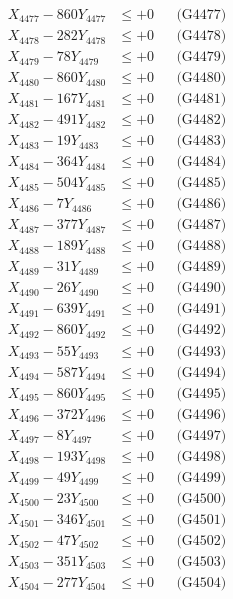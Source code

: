 \documentclass[a4paper,10pt]{article}
\begin{document}
{\begin{align}
X_{4477} - 860Y_{4477} &\leq +0 && \text{(G4477)} \\
X_{4478} - 282Y_{4478} &\leq +0 && \text{(G4478)} \\
X_{4479} - 78Y_{4479} &\leq +0 && \text{(G4479)} \\
X_{4480} - 860Y_{4480} &\leq +0 && \text{(G4480)} \\
\allowbreak
X_{4481} - 167Y_{4481} &\leq +0 && \text{(G4481)} \\
X_{4482} - 491Y_{4482} &\leq +0 && \text{(G4482)} \\
X_{4483} - 19Y_{4483} &\leq +0 && \text{(G4483)} \\
X_{4484} - 364Y_{4484} &\leq +0 && \text{(G4484)} \\
X_{4485} - 504Y_{4485} &\leq +0 && \text{(G4485)} \\
X_{4486} - 7Y_{4486} &\leq +0 && \text{(G4486)} \\
X_{4487} - 377Y_{4487} &\leq +0 && \text{(G4487)} \\
X_{4488} - 189Y_{4488} &\leq +0 && \text{(G4488)} \\
X_{4489} - 31Y_{4489} &\leq +0 && \text{(G4489)} \\
X_{4490} - 26Y_{4490} &\leq +0 && \text{(G4490)} \\
\allowbreak
X_{4491} - 639Y_{4491} &\leq +0 && \text{(G4491)} \\
X_{4492} - 860Y_{4492} &\leq +0 && \text{(G4492)} \\
X_{4493} - 55Y_{4493} &\leq +0 && \text{(G4493)} \\
X_{4494} - 587Y_{4494} &\leq +0 && \text{(G4494)} \\
X_{4495} - 860Y_{4495} &\leq +0 && \text{(G4495)} \\
X_{4496} - 372Y_{4496} &\leq +0 && \text{(G4496)} \\
X_{4497} - 8Y_{4497} &\leq +0 && \text{(G4497)} \\
X_{4498} - 193Y_{4498} &\leq +0 && \text{(G4498)} \\
X_{4499} - 49Y_{4499} &\leq +0 && \text{(G4499)} \\
X_{4500} - 23Y_{4500} &\leq +0 && \text{(G4500)} \\
\allowbreak
X_{4501} - 346Y_{4501} &\leq +0 && \text{(G4501)} \\
X_{4502} - 47Y_{4502} &\leq +0 && \text{(G4502)} \\
X_{4503} - 351Y_{4503} &\leq +0 && \text{(G4503)} \\
X_{4504} - 277Y_{4504} &\leq +0 && \text{(G4504)} \\

\end{align}}
\end{document}
